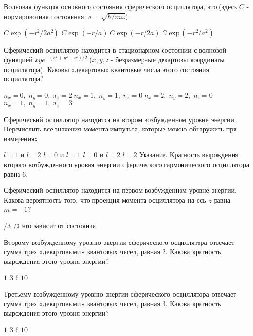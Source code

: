 \documentclass[11pt,a4paper]{exam}
\begin{document}
\begin{questions}
\question Волновая функция основного состояния сферического осциллятора, это (здесь $C$ - нормировочная постоянная, $a = \sqrt {\hbar /m\omega } $).
\begin{choices}
\choice $C\exp ( - {r^2}/2{a^2})$     
\choice $C\exp ( - r/a)$  
\choice $C\exp ( - r/2a)$ 
\choice $C\exp ( - {r^2}/{a^2})$ 
\end{choices}

\question  Сферический осциллятор находится в стационарном состоянии с волновой функцией $xy{e^{ - ({x^2} + {y^2} + {z^2})/2}}$ ($x,y,z$ - безразмерные декартовы координаты осциллятора). Каковы «декартовы» квантовые числа этого состояния осциллятора?
\begin{choices}
\choice ${n_x} = 0,\;{n_y} = 0,\;{n_z} = 2$    
\choice ${n_x} = 1,\;{n_y} = 1,\;{n_z} = 0$
\choice ${n_x} = 2,\;{n_y} = 2,\;{n_z} = 0$    
\choice ${n_x} = 1,\;{n_y} = 1,\;{n_z} = 3$
\end{choices}

\question Сферический осциллятор находится на втором возбужденном уровне энергии. Перечислить все значения момента импульса, которые можно обнаружить при измерениях
\begin{choices}
\choice $l = 1$ и $l = 2$       
\choice $l = 0$ и $l = 1$       
\choice $l = 0$ и $l = 2$       
\choice $l = 2$ 
Указание. Кратность вырождения второго возбужденного уровня энергии сферического гармонического осциллятора равна 6. 
\end{choices}

\question Сферический осциллятор находится на первом возбужденном уровне энергии. Какова вероятность того, что проекция момента осциллятора на ось $z$ равна $m =  - 1$?
\begin{choices}
/3            
/3         
\choice это зависит от состояния
\end{choices}

\question Второму возбужденному уровню энергии сферического осциллятора отвечает сумма трех «декартовыми» квантовых чисел, равная 2. Какова кратность вырождения этого уровня энергии? 
\begin{choices}
\choice $1$      
\choice $3$      
\choice $6$      
\choice $10$ 
\end{choices}

\question Третьему возбужденному уровню энергии сферического осциллятора отвечает сумма трех «декартовыми» квантовых чисел, равная 3. Какова кратность вырождения этого уровня энергии? 
\begin{choices}
\choice $1$      
\choice $3$      
\choice $6$      
\choice $10$ 
\end{choices}


\end{questions}
\end{document}
